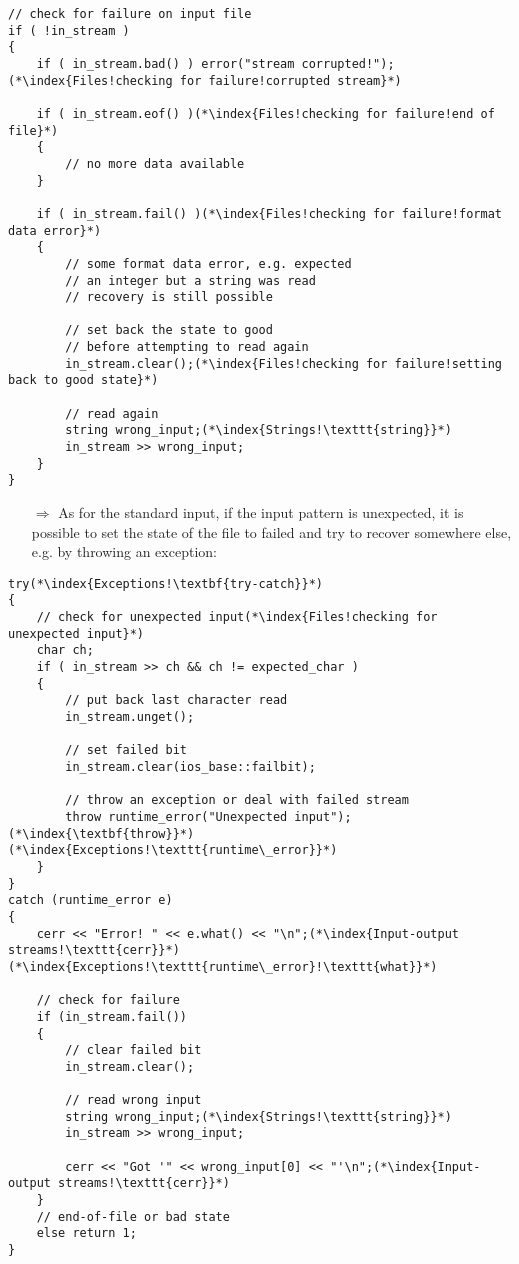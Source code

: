 \documentclass[10pt]{article}
\begin{document}
\begin{lstlisting}
// check for failure on input file
if ( !in_stream )
{
    if ( in_stream.bad() ) error("stream corrupted!");(*\index{Files!checking for failure!corrupted stream}*)
    
    if ( in_stream.eof() )(*\index{Files!checking for failure!end of file}*)
    { 
        // no more data available
    }
    
    if ( in_stream.fail() )(*\index{Files!checking for failure!format data error}*)
    {
        // some format data error, e.g. expected
        // an integer but a string was read
        // recovery is still possible
        
        // set back the state to good 
        // before attempting to read again
        in_stream.clear();(*\index{Files!checking for failure!setting back to good state}*)
        
        // read again
        string wrong_input;(*\index{Strings!\texttt{string}}*)
        in_stream >> wrong_input;
    }
}
\end{lstlisting}
\begin{enumerate}
\item[$\Rightarrow$] As for the standard input, if the input pattern is unexpected, it is possible to set the state of the file to failed and try to recover somewhere else, e.g. by throwing an exception:
\end{enumerate}
\begin{lstlisting}
try(*\index{Exceptions!\textbf{try-catch}}*)
{
    // check for unexpected input(*\index{Files!checking for unexpected input}*)
    char ch;
    if ( in_stream >> ch && ch != expected_char )
    {
        // put back last character read
        in_stream.unget();
        
        // set failed bit
        in_stream.clear(ios_base::failbit);
    
        // throw an exception or deal with failed stream
        throw runtime_error("Unexpected input");(*\index{\textbf{throw}}*)(*\index{Exceptions!\texttt{runtime\_error}}*)
    }
}
catch (runtime_error e)
{
    cerr << "Error! " << e.what() << "\n";(*\index{Input-output streams!\texttt{cerr}}*)(*\index{Exceptions!\texttt{runtime\_error}!\texttt{what}}*)
            
    // check for failure
    if (in_stream.fail())
    {
        // clear failed bit
        in_stream.clear();
                
        // read wrong input
        string wrong_input;(*\index{Strings!\texttt{string}}*)
        in_stream >> wrong_input;
                    
        cerr << "Got '" << wrong_input[0] << "'\n";(*\index{Input-output streams!\texttt{cerr}}*)
    }
    // end-of-file or bad state
    else return 1;
}
\end{lstlisting}
\end{document}
